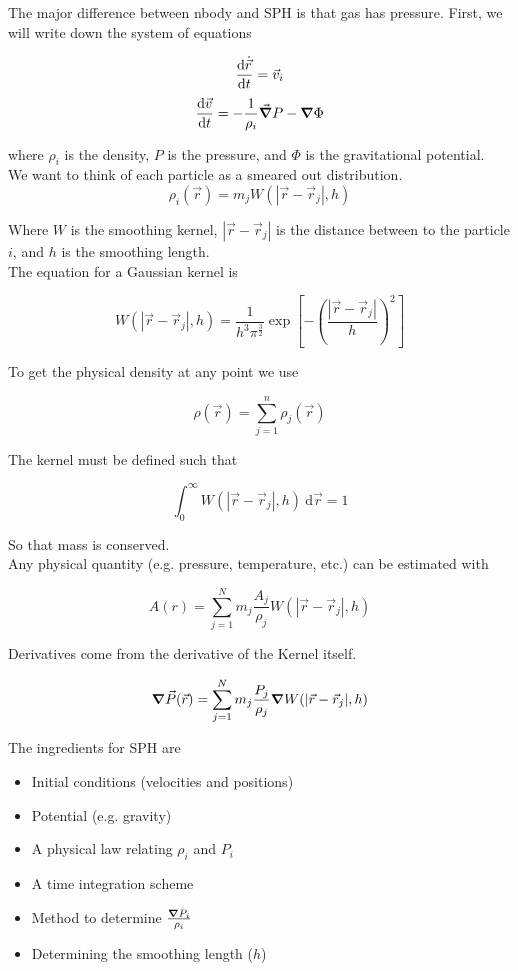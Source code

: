 \documentclass[]{article}
\begin{document}
The major difference between nbody and SPH is that gas has pressure. First, we will write down the system of equations

\[\dv{\dot{\vec{r}}}{t} = \vec{v}_i\]
\[\dv{\vec{v}}{t} = -\frac{1}{\rho_i} \vec{\grad}{P} - \grad{\Phi}\]

where $\rho_i$ is the density, $P$ is the pressure, and $\Phi$ is the gravitational potential.\\

We want to think of each particle as a smeared out distribution.\\

\[\rho_i(\vec{r}) = m_j W(|\vec{r} - \vec{r}_j|, h)\]

Where $W$ is the smoothing kernel, $|\vec{r} - \vec{r}_j|$ is the distance between to the particle $i$, and $h$ is the smoothing length. \\



The equation for a Gaussian kernel is

\[W(|\vec{r} - \vec{r}_j|, h) = \frac{1}{h^3\pi^\frac{3}{2}} \exp[-\left(\frac{|\vec{r} - \vec{r}_j|}{h}\right)^2]\]

To get the physical density at any point we use

\[\rho(\vec{r}) = \sum_{j=1}^{n} \rho_j(\vec{r})\]

The kernel must be defined such that

\[\int_{0}^{\infty} W(|\vec{r} - \vec{r}_j|, h)~\text{d}\vec{r} = 1\]

So that mass is conserved. \\

Any physical quantity (e.g. pressure, temperature, etc.) can be estimated with

\[A(r) = \sum_{j=1}^{N}m_j \frac{A_j}{\rho_j} W(|\vec{r} - \vec{r}_j|, h)\]

Derivatives come from the derivative of the Kernel itself.

\[\grad{\vec{P}(\vec{r})} = \sum_{j=1}^N m_j \frac{P_j}{\rho_j} \grad{W(|\vec{r} - \vec{r}_j|, h)}\]

The ingredients for SPH are

\begin{itemize}
	\item Initial conditions (velocities and positions)
	\item Potential (e.g. gravity)
	\item A physical law relating $\rho_i$ and $P_i$
	\item A time integration scheme
	\item Method to determine $\frac{\grad{P_i}}{\rho_i}$
	\item Determining the smoothing length ($h$)
\end{itemize}\bigbreak
\end{document}
